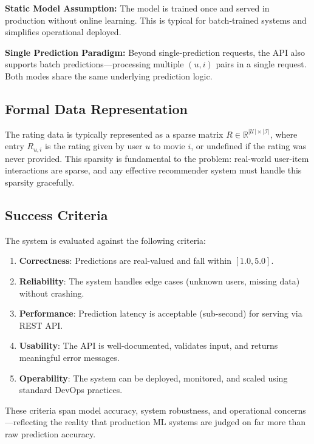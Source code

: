 \textbf{Static Model Assumption:} The model is trained once and served in production without online learning. 
This is typical for batch-trained systems and simplifies operational deployed.

\textbf{Single Prediction Paradigm:} Beyond single-prediction requests, the API also supports batch 
predictions---processing multiple $(u, i)$ pairs in a single request. Both modes share the same underlying 
prediction logic.

\subsection{Formal Data Representation}

The rating data is typically represented as a sparse matrix $R \in \mathbb{R}^{|\mathcal{U}| \times |\mathcal{I}|}$, 
where entry $R_{u,i}$ is the rating given by user $u$ to movie $i$, or undefined if the rating was never 
provided. This sparsity is fundamental to the problem: real-world user-item interactions are sparse, 
and any effective recommender system must handle this sparsity gracefully.

\subsection{Success Criteria}

The system is evaluated against the following criteria:

\begin{enumerate}
  \item \textbf{Correctness}: Predictions are real-valued and fall within $[1.0, 5.0]$.
  
  \item \textbf{Reliability}: The system handles edge cases (unknown users, missing data) without crashing.
  
  \item \textbf{Performance}: Prediction latency is acceptable (sub-second) for serving via REST API.
  
  \item \textbf{Usability}: The API is well-documented, validates input, and returns meaningful error messages.
  
  \item \textbf{Operability}: The system can be deployed, monitored, and scaled using standard DevOps practices.
\end{enumerate}

These criteria span model accuracy, system robustness, and operational concerns---reflecting the reality 
that production ML systems are judged on far more than raw prediction accuracy.
